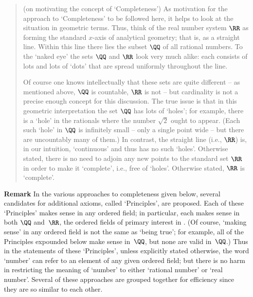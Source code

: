 \VV

\begin{quotation}
{\footnotesize \underline{\Note}(on motivating the concept of `Completeness')
        As motivation for the approach to `Completeness' to be followed here, it helps to look at the situation in geometric terms.
    Thus, think of the real number system ${\RR}$ as forming the standard $x$-axis of analytical geometry; that is, as a straight line.
    Within this line there lies the subset ${\QQ}$ of all rational numbers.
    To the `naked eye' the sets ${\QQ}$ and ${\RR}$ look very much alike: each consists of lots and lots of `dots' that are spread uniformly throughout the line.

        Of course one knows intellectually that these sets are quite different -- as mentioned above, ${\QQ}$ is countable, ${\RR}$ is not -- but cardinality is not a precise enough concept for this discussion.
    The true issue is that in this geometric interpretation the set ${\QQ}$ has lots of `holes'; for example, there is a `hole' in the rationals where the number $\sqrt{2}$ ought to appear.
    (Each such `hole' in ${\QQ}$ is infinitely small -- only a single point wide -- but there are uncountably many of them.)
    In contrast, the straight line (i.e., ${\RR}$) is, in our intuition,  `continuous' and thus has no such `holes'.
    Otherwise stated, there is no need to adjoin any new points to the standard set ${\RR}$ in order to make it `complete', i.e., free of `holes'.
    Otherwise stated, ${\RR}$ is `complete'.
}%
\end{quotation}       

\VV

        {\bf Remark} In the various approaches to completeness given below,  several candidates for additional axioms, called `Principles', are proposed.
    Each of these `Principles' makes sense in any ordered field; in particular, each makes sense in both ${\QQ}$ and~${\RR}$,
    the ordered fields of primary interest in {\ThisText}. (Of course, `making sense' in any ordered field is not the same as `being true';
    for example, all of the Principles expounded below make sense in~${\QQ}$, but none are valid in~${\QQ}$.)
    Thus in the statements of these `Principles',
    unless explicitly stated otherwise, the word `number' can refer to an element of any given ordered field;
    but there is no harm in restricting the meaning of `number' to either `rational number' or `real number'.
    Several of these approaches are grouped together for efficiency since they are so similar to each other.

